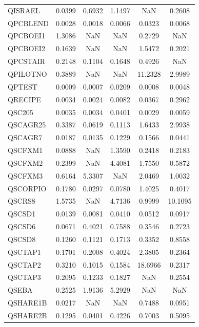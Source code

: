 \begin{longtable}{lccccc}
QISRAEL  &   0.0399 &   0.6932 &   1.1497 &      NaN &   0.2608 \\
QPCBLEND &   0.0028 &   0.0018 &   0.0066 &   0.0323 &   0.0068 \\
QPCBOEI1 &   1.3086 &      NaN &      NaN &   0.2729 &      NaN \\
QPCBOEI2 &   0.1639 &      NaN &      NaN &   1.5472 &   0.2021 \\
QPCSTAIR &   0.2148 &   0.1104 &   0.1648 &   0.4926 &      NaN \\
QPILOTNO &   0.3889 &      NaN &      NaN &  11.2328 &   2.9989 \\
QPTEST   &   0.0009 &   0.0007 &   0.0209 &   0.0008 &   0.0048 \\
QRECIPE  &   0.0034 &   0.0024 &   0.0082 &   0.0367 &   0.2962 \\
QSC205   &   0.0035 &   0.0034 &   0.0401 &   0.0029 &   0.0059 \\
QSCAGR25 &   0.3387 &   0.0619 &   0.1113 &   1.6433 &   2.9938 \\
QSCAGR7  &   0.0187 &   0.0135 &   0.1229 &   0.1566 &   0.0441 \\
QSCFXM1  &   0.0888 &      NaN &   1.3590 &   0.2418 &   0.2183 \\
QSCFXM2  &   0.2399 &      NaN &   4.4081 &   1.7550 &   0.5872 \\
QSCFXM3  &   0.6164 &   5.3307 &      NaN &   2.0469 &   1.0032 \\
QSCORPIO &   0.1780 &   0.0297 &   0.0780 &   1.4025 &   0.4017 \\
QSCRS8   &   1.5735 &      NaN &   4.7136 &   0.9999 &  10.1095 \\
QSCSD1   &   0.0139 &   0.0081 &   0.0410 &   0.0512 &   0.0917 \\
QSCSD6   &   0.0671 &   0.4021 &   0.7588 &   0.3546 &   0.2723 \\
QSCSD8   &   0.1260 &   0.1121 &   0.1713 &   0.3352 &   0.8558 \\
QSCTAP1  &   0.1701 &   0.2008 &   0.4024 &   2.3805 &   0.2364 \\
QSCTAP2  &   0.3210 &   0.1015 &   0.1584 &  18.6966 &   0.2317 \\
QSCTAP3  &   0.2095 &   0.1233 &   0.1827 &      NaN &   0.2554 \\
QSEBA    &   0.2525 &   1.9136 &   5.2929 &      NaN &      NaN \\
QSHARE1B &   0.0217 &      NaN &      NaN &   0.7488 &   0.0951 \\
QSHARE2B &   0.1295 &   0.0401 &   0.4226 &   0.7003 &   0.5095 \\

\end{longtable}
